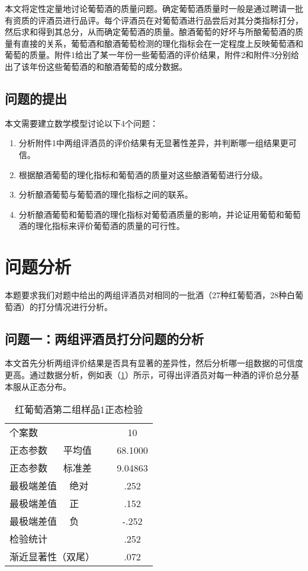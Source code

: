 \documentclass[withoutpreface,bwprint]{cumcmthesis} %
\begin{document}
\par 本文将定性定量地讨论葡萄酒的质量问题。确定葡萄酒质量时一般是通过聘请一批有资质的评酒员进行品评。每个评酒员在对葡萄酒进行品尝后对其分类指标打分，然后求和得到其总分，从而确定葡萄酒的质量。酿酒葡萄的好坏与所酿葡萄酒的质量有直接的关系，葡萄酒和酿酒葡萄检测的理化指标会在一定程度上反映葡萄酒和葡萄的质量。附件1给出了某一年份一些葡萄酒的评价结果，附件2和附件3分别给出了该年份这些葡萄酒的和酿酒葡萄的成分数据。
\subsection{问题的提出}

本文需要建立数学模型讨论以下4个问题：

\begin{enumerate}
  \item 分析附件1中两组评酒员的评价结果有无显著性差异，并判断哪一组结果更可信。
  \item 根据酿酒葡萄的理化指标和葡萄酒的质量对这些酿酒葡萄进行分级。
  \item 分析酿酒葡萄与葡萄酒的理化指标之间的联系。
  \item 分析酿酒葡萄和葡萄酒的理化指标对葡萄酒质量的影响，并论证用葡萄和葡萄酒的理化指标来评价葡萄酒的质量的可行性。
\end{enumerate}


\section{问题分析}

\par 本题要求我们对题中给出的两组评酒员对相同的一批酒（27种红葡萄酒，28种白葡萄酒）的打分情况进行分析。

\subsection{问题一：两组评酒员打分问题的分析}

\par 本文首先分析两组评价结果是否具有显著的差异性，然后分析哪一组数据的可信度更高。通过数据分析，例如表（\ref{红葡萄酒第二组样品1正态检验}）所示，可得出评酒员对每一种酒的评价总分基本服从正态分布。


\begin{table}
\centering
\caption{红葡萄酒第二组样品1正态检验}
\label{红葡萄酒第二组样品1正态检验}
\begin{tabular}{l|c}
\toprule
  个案数 & 10 \\
 正态参数 $\quad$ 平均值 & 68.1000  \\
 正态参数 $\quad$ 标准差 & 9.04863\\
 最极端差值	$\quad$绝对	&.252\\
最极端差值	$\quad$正	&.152\\
最极端差值	$\quad$负	&-.252\\
检验统计		$\quad$& .252\\
渐近显著性（双尾）		$\quad$& .072\\
\bottomrule
\end{tabular}

\end{table}
\end{document}
